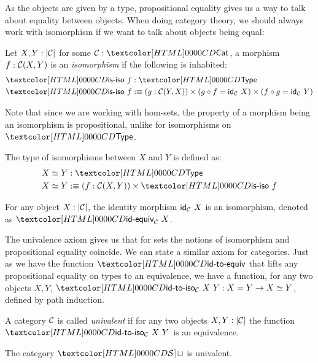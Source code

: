 As the objects are given by a type, propositional equality gives us a
way to talk about equality between objects. When doing category
theory, we should always work with isomorphism if we want to talk
about objects being equal:

\begin{definition}[Isomorphism]
  Let $X, Y : | \mathcal{C} |$ for some $\Cc : \Cat$, a morphism
  $f : \mathcal{C}(X,Y)$ is an \emph{isomorphism} if the following is
  inhabited:
  \begin{align*}
    &\isiso\ f : \Type \\
    &\isiso\ f \ddefeq (g : \Cc(Y,X)) \times (g \circ f = \id_{\Cc}\ X) \times (f \circ g = \id_{\Cc}\ Y)
  \end{align*}
\end{definition}

Note that since we are working with hom-sets, the property of a
morphism being an isomorphism is propositional, unlike for
isomorphisms on $\Type$.

\begin{definition}
  The type of isomorphisms between $X$ and $Y$ is defined as:
  \begin{align*}
  &\Iso{X}{Y} : \Type \\
  &\Iso{X}{Y} \ddefeq (f : \Cc(X,Y)) \times \isiso\ f
  \end{align*}
\end{definition}

For any object $X : | \mathcal{C} |$, the identity morphism $\id_{\Cc}\ X$ is
an isomorphism, denoted as $\idequiv_{\Cc}\ X$.

The univalence axiom gives us that for sets the notions of isomorphism
and propositional equality coincide. We can state a similar axiom for
categories. Just as we have the function $\idtoequiv$ that lifts any
propositional equality on types to an equivalence, we have a function,
for any two objects $X, Y$, $\idtoiso_{\Cc}\ X\ Y : X = Y \to \Iso{X}{Y}$,
defined by path induction.

\begin{definition}
  A category $\mathcal{C}$ is called \emph{univalent} if for any two objects
  $X, Y : | \mathcal{C} |$ the function $\idtoiso_{\Cc}\ X\ Y$ is an
  equivalence.
\end{definition}

\begin{proposition}
  The category $\SET$ is univalent.
\end{proposition}

